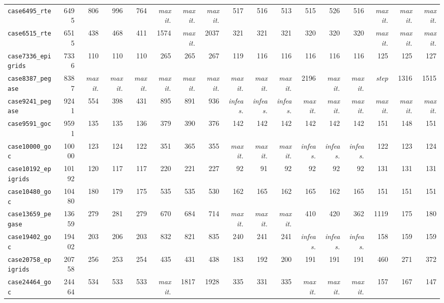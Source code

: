{\begin{longtable}{lrrrrrrrrrrrrrrrr}
\texttt{case6495\_rte} & 6495 & 806 & 996 & 764 & \textit{max it.} & \textit{max it.} & \textit{max it.} & 517 & 516 & 513 & 515 & 526 & 516 & \textit{max it.} & \textit{max it.} & \textit{max it.} \\
\texttt{case6515\_rte} & 6515 & 438 & 468 & 411 & 1574 & \textit{max it.} & 2037 & 321 & 321 & 321 & 320 & 320 & 320 & \textit{max it.} & \textit{max it.} & \textit{max it.} \\
\texttt{case7336\_epigrids} & 7336 & 110 & 110 & 110 & 265 & 265 & 267 & 119 & 116 & 116 & 116 & 116 & 116 & 125 & 125 & 127 \\
\texttt{case8387\_pegase} & 8387 & \textit{max it.} & \textit{max it.} & \textit{max it.} & \textit{max it.} & \textit{max it.} & \textit{max it.} & \textit{max it.} & \textit{max it.} & \textit{max it.} & 2196 & \textit{max it.} & \textit{max it.} & \textit{step} & 1316 & 1515 \\
\texttt{case9241\_pegase} & 9241 & 554 & 398 & 431 & 895 & 891 & 936 & \textit{infeas.} & \textit{infeas.} & \textit{infeas.} & \textit{max it.} & \textit{max it.} & \textit{max it.} & \textit{max it.} & \textit{max it.} & \textit{max it.} \\
\texttt{case9591\_goc} & 9591 & 135 & 135 & 136 & 379 & 390 & 376 & 142 & 142 & 142 & 142 & 142 & 142 & 151 & 148 & 151 \\
\texttt{case10000\_goc} & 10000 & 123 & 124 & 122 & 351 & 365 & 355 & \textit{max it.} & \textit{max it.} & \textit{max it.} & \textit{infeas.} & \textit{infeas.} & \textit{infeas.} & 122 & 123 & 124 \\
\texttt{case10192\_epigrids} & 10192 & 120 & 117 & 117 & 220 & 221 & 227 & 92 & 91 & 92 & 92 & 92 & 92 & 131 & 131 & 131 \\
\texttt{case10480\_goc} & 10480 & 180 & 179 & 175 & 535 & 535 & 530 & 162 & 165 & 162 & 165 & 162 & 165 & 151 & 151 & 151 \\
\texttt{case13659\_pegase} & 13659 & 279 & 281 & 279 & 670 & 684 & 714 & \textit{max it.} & \textit{max it.} & \textit{max it.} & 410 & 420 & 362 & 1119 & 175 & 180 \\
\texttt{case19402\_goc} & 19402 & 203 & 206 & 203 & 832 & 821 & 835 & 240 & 241 & 241 & \textit{infeas.} & \textit{infeas.} & \textit{infeas.} & 158 & 159 & 159 \\
\texttt{case20758\_epigrids} & 20758 & 256 & 253 & 254 & 435 & 431 & 438 & 183 & 192 & 200 & 191 & 191 & 191 & 460 & 271 & 372 \\
\texttt{case24464\_goc} & 24464 & 534 & 533 & 533 & \textit{max it.} & 1817 & 1928 & 335 & 331 & 335 & \textit{max it.} & \textit{max it.} & \textit{max it.} & 157 & 167 & 147 \\

\end{longtable}}
